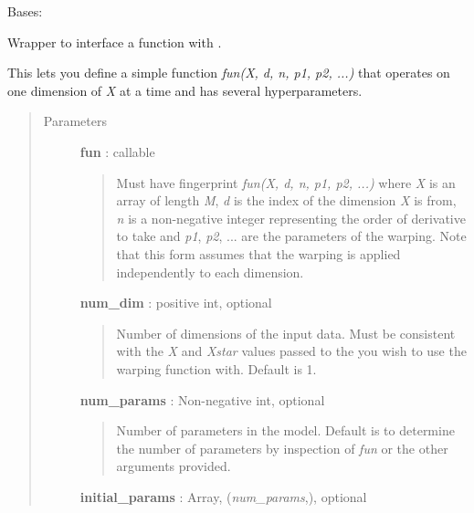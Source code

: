 \documentclass[letterpaper,10pt,english]{sphinxmanual}
\begin{document}
\begin{fulllineitems}
\label{gptools.kernel:gptools.kernel.warping.WarpingFunction}
Bases: 

Wrapper to interface a function with {\hyperref[gptools.kernel:gptools.kernel.warping.WarpedKernel]{}}.

This lets you define a simple function \emph{fun(X, d, n, p1, p2, ...)} that
operates on one dimension of \emph{X} at a time and has several hyperparameters.
\begin{quote}\begin{description}
\item[{Parameters}] \leavevmode
\textbf{fun} : callable
\begin{quote}

Must have fingerprint \emph{fun(X, d, n, p1, p2, ...)} where \emph{X} is an array
of length \emph{M}, \emph{d} is the index of the dimension \emph{X} is from, \emph{n} is a
non-negative integer representing the order of derivative to take and
\emph{p1}, \emph{p2}, ... are the parameters of the warping. Note that this form
assumes that the warping is applied independently to each dimension.
\end{quote}

\textbf{num\_dim} : positive int, optional
\begin{quote}

Number of dimensions of the input data. Must be consistent with the \emph{X}
and \emph{Xstar} values passed to the
{\hyperref[gptools:gptools.gaussian_process.GaussianProcess]{}} you wish to use
the warping function with. Default is 1.
\end{quote}

\textbf{num\_params} : Non-negative int, optional
\begin{quote}

Number of parameters in the model. Default is to determine the number of
parameters by inspection of \emph{fun} or the other arguments provided.
\end{quote}

\textbf{initial\_params} : Array, (\emph{num\_params},), optional
\begin{quote}


\end{quote}
\end{description}
\end{quote}
\end{fulllineitems}
\end{document}
